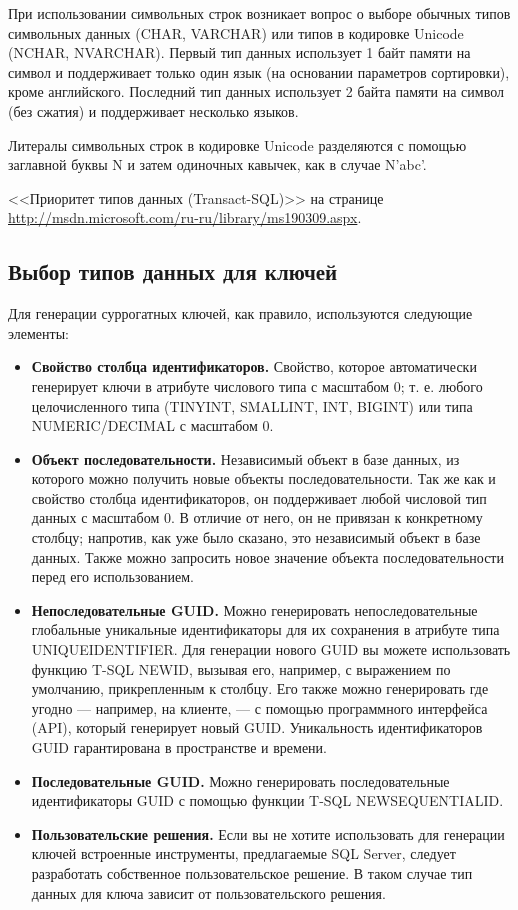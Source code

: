 При использовании символьных строк возникает вопрос о выборе обычных типов
символьных данных (CHAR, VARCHAR) или типов в кодировке Unicode (NCHAR,
NVARCHAR). Первый тип данных использует 1 байт памяти на символ и поддерживает
только один язык (на основании параметров сортировки), кроме английского. Последний тип данных использует 2 байта памяти на символ (без сжатия) и поддерживает несколько языков.

Литералы символьных строк в кодировке Unicode разделяются с помощью заглавной буквы N и затем одиночных кавычек, как в случае N'abc'.

<<Приоритет типов данных (Transact-SQL)>> на странице \url{http://msdn.microsoft.com/ru-ru/library/ms190309.aspx}.

\subsection{Выбор типов данных для ключей}
Для генерации суррогатных ключей, как правило, используются следующие элементы:

\begin{itemize}
	\item \textbf{Свойство столбца идентификаторов.} Свойство, которое автоматически генерирует ключи в атрибуте числового типа с масштабом 0; т. е. любого целочисленного типа (TINYINT, SMALLINT, INT, BIGINT) или типа NUMERIC/DECIMAL с масштабом 0.  
	\item \textbf{Объект последовательности.} Независимый объект в базе данных, из которого можно получить новые объекты последовательности. Так же как и свойство столбца идентификаторов, он поддерживает любой числовой тип данных с масштабом 0. В отличие от него, он не привязан к конкретному столбцу; напротив, как уже было сказано, это независимый объект в базе данных. Также можно запросить новое значение объекта последовательности перед его использованием.
	\item \textbf{Непоследовательные GUID.} Можно генерировать непоследовательные глобальные уникальные идентификаторы для их сохранения в атрибуте типа UNIQUEIDENTIFIER. Для генерации нового GUID вы можете использовать функцию T-SQL NEWID, вызывая его, например, с выражением по умолчанию, прикрепленным к столбцу. Его также можно генерировать где угодно — например, на клиенте, — с помощью программного интерфейса (API), который генерирует новый GUID. Уникальность идентификаторов GUID гарантирована в пространстве и времени.
	\item \textbf{Последовательные GUID.} Можно генерировать последовательные идентификаторы GUID с помощью функции T-SQL NEWSEQUENTIALID. 
	\item \textbf{Пользовательские решения.} Если вы не хотите использовать для генерации ключей встроенные инструменты, предлагаемые SQL Server, следует разработать собственное пользовательское решение. В таком случае тип данных для ключа зависит от пользовательского решения. 
\end{itemize}

